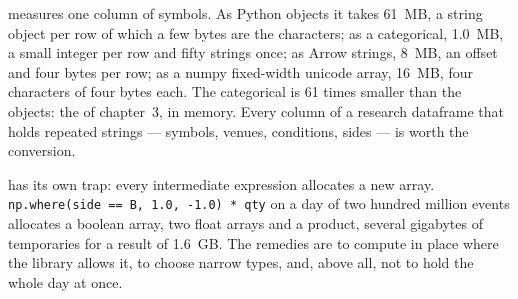 \begin{omfigure}

\label{fig:pl:python-at-scale:memory}
\end{omfigure}

 measures one column of symbols. As Python objects it takes 61~MB, a string object per row of
which a few bytes are the characters; as a categorical, 1.0~MB, a small integer per row and fifty strings once; as Arrow strings,
8~MB, an offset and four bytes per row; as a numpy fixed-width unicode array, 16~MB, four characters of four bytes each. The
categorical is 61 times smaller than the objects: the  of chapter~3, in memory. Every column of a research
dataframe that holds repeated strings --- symbols, venues, conditions, sides --- is worth the conversion.

\begin{remark}[Copies]\label{rem:pl:python-at-scale:copies}
 has its own trap: every intermediate expression allocates a new array. \texttt{np.where(side == B, 1.0, -1.0) *
qty} on a day of two hundred million events allocates a boolean array, two float arrays and a product, several gigabytes of
temporaries for a result of 1.6~GB. The remedies are to compute in place where the library allows it, to choose narrow types, and,
above all, not to hold the whole day at once.
\end{remark}

